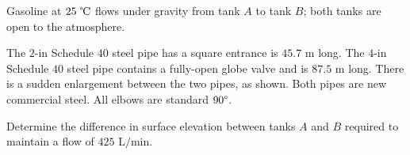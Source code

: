 \documentclass[10pt]{amsart}
\begin{document}
Gasoline at $25\text{ \textcelsius}$ flows under gravity from tank $A$ to tank $B$; both tanks are open to the
atmosphere.

The $2$-in Schedule $40$ steel pipe has a square entrance is $45.7\text{	m}$ long. The $4$-in Schedule $40$ steel
pipe contains a fully-open globe valve and is $87.5\text{ m}$ long. There is a sudden enlargement between the two
pipes, as shown. Both pipes are new commercial steel. All elbows are standard $90\degree$.

Determine the difference in surface elevation between tanks $A$
and $B$ required to maintain a flow of $425\text{ L/min}$.


\begin{multicols}{2}
	
	
	
	\vfill\columnbreak
	

\end{multicols}
\end{document}
